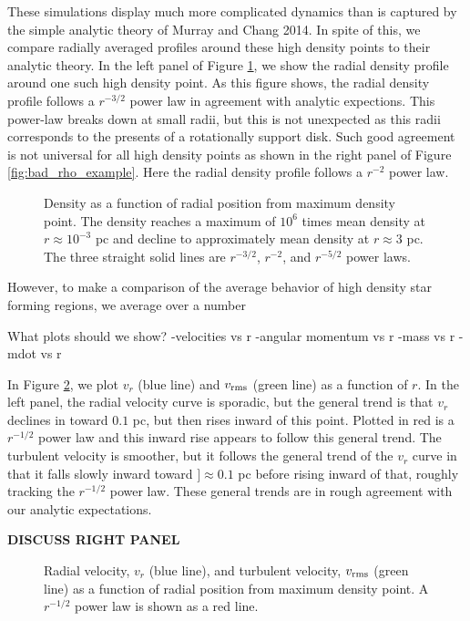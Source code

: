 \documentclass{emulateapj}
\begin{document}
These simulations display much more complicated dynamics than is captured by the simple analytic theory of Murray and Chang 2014.  In spite of this, we compare radially averaged profiles around these high density points to their analytic theory.  In the left panel of Figure \ref{fig:good_rho_example}, we show the radial density profile around one such high density point. As this figure shows, the radial density profile follows a $r^{-3/2}$ power law in agreement with analytic expections.  This power-law breaks down at small radii, but this is not unexpected as this radii corresponds to the presents of a rotationally support disk.  Such good agreement is not universal for all high density points as shown in the right panel of Figure \ref{fig:bad_rho_example}.  Here the radial density profile follows a $r^{-2}$ power law.  
\begin{figure*}
\caption{Density as a function of radial position from maximum density point.  The density reaches a maximum of $10^6$ times mean density at $r \approx 10^{-3}$ pc and decline to approximately mean density at $r\approx 3$ pc.  The three straight solid lines are $r^{-3/2}$, $r^{-2}$, and $r^{-5/2}$ power laws. \label{fig:good_rho_example}}
\end{figure*}


However, to make a comparison of the average behavior of high density star forming regions, we average over a number 

What plots should we show?
-velocities vs r
-angular momentum vs r
-mass vs r
-mdot vs r

In Figure \ref{fig:vr_example}, we plot $v_r$ (blue line) and $v_{\rm rms}$ (green line) as a function of $r$.  In the left panel, the radial velocity curve is sporadic, but the general trend is that $v_r$ declines in toward $0.1$ pc, but then rises inward of this point.  Plotted in red is a $r^{-1/2}$ power law and this inward rise appears to follow this general trend.  The turbulent velocity is smoother, but it follows the general trend of the $v_r$ curve in that it falls slowly inward toward $]\approx 0.1 $ pc before rising inward of that, roughly tracking the $r^{-1/2}$ power law.  These general trends are in rough agreement with our analytic expectations.  

{\bf DISCUSS RIGHT PANEL} 
 
\begin{figure*}
\caption{Radial velocity, $v_r$ (blue line), and turbulent velocity, $v_{\rm rms}$ (green line) as a function of radial position from maximum density point.  A $r^{-1/2}$ power law is shown as a red line. \label{fig:vr_example}}
\end{figure*}
\end{document}
